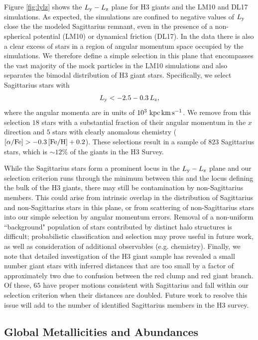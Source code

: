 \documentclass[twocolumn,tighten,twocolappendix]{aastex63}
\newcommand{\sgr}{Sagittarius}
\newcommand{\Ly}{L_{\rm y}}
\newcommand{\Lz}{L_{\rm z}}
\newcommand{\lunits}{{\rm kpc}\,{\rm km} \, {\rm s}^{-1}}
\newcommand{\NhiLx}{18}     %
\newcommand{\Nbchem}{5}      %
\newcommand{\Nsgr}{823}     %
\begin{document}
\begin{CJK*}{UTF8}{gbsn}
Figure \ref{fig:lylz} shows the $\Ly-\Lz$ plane for H3 giants and the LM10 and DL17 simulations.  As expected, the simulations are confined to negative values of $\Ly$ close the the modeled \sgr{} remnant, even in the presence of a non-spherical potential (LM10) or dynamical friction (DL17).  In the data there is also a clear excess of stars in a region of angular momentum space occupied by the simulations.  We therefore define a simple selection in this plane that encompasses the vast majority of the mock particles in the LM10 simulations and also separates the bimodal distribution of H3 giant stars.  Specifically, we select \sgr{} stars with
\begin{eqnarray}
\Ly < -2.5 - 0.3\, \Lz,
\end{eqnarray}
where the angular momenta are in units of $10^3 \,\, \lunits$. We remove from this selection $\NhiLx$ stars with a substantial fraction of their angular momentum in the $x$ direction and $\Nbchem$ stars with clearly anomalous chemistry ($[\alpha/\rm{Fe}] > -0.3 \, [\rm{Fe}/\rm{H}] + 0.2$).  These selections result in a sample of $\Nsgr$ \sgr{} stars, which is $\sim 12$\% of the giants in the H3 Survey.

While the \sgr{} stars form a prominent locus in the $\Ly-\Lz$ plane and our selection criterion runs through the minimum between this and the locus defining the bulk of the H3 giants, there may still be contamination by non-\sgr{} members.  This could arise from intrinsic overlap in the distribution of \sgr{} and non-\sgr{} stars in this plane, or from scattering of non-\sgr{} stars into our simple selection by angular momentum errors. Removal of a non-uniform ``background" population of stars contributed by distinct halo structures \citep[e.g.][]{Naidu20} is difficult; probabilistic classification and selection may prove useful in future work, as well as consideration of additional observables (e.g. chemistry).
Finally, we note that detailed investigation of the H3 giant sample has revealed a small number giant stars with inferred distances that are too small by a factor of approximately two due to confusion between the red clump and red giant branch.  Of these, $65$ have proper motions consistent with \sgr{} and fall within our selection criterion when their distances are doubled.  Future work to resolve this issue will add to the number of identified \sgr{} members in the H3 survey.

\subsection{Global Metallicities and Abundances}


\end{CJK*}
\end{document}
